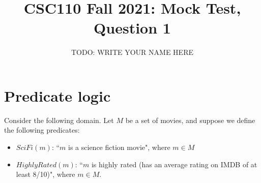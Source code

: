 \documentclass{article}
\title{CSC110 Fall 2021: Mock Test, Question 1}
\author{TODO: WRITE YOUR NAME HERE}
\begin{document}
\maketitle

\section*{Predicate logic}

Consider the following domain.
Let $M$ be a set of movies, and suppose we define the following predicates:

\begin{itemize}
\item $SciFi(m)$: ``$m$ is a science fiction movie", where $m \in M$
\item $HighlyRated(m)$: ``$m$ is highly rated (has an average rating on IMDB of at least 8/10)", where $m \in M$.
\end{itemize}
\end{document}
